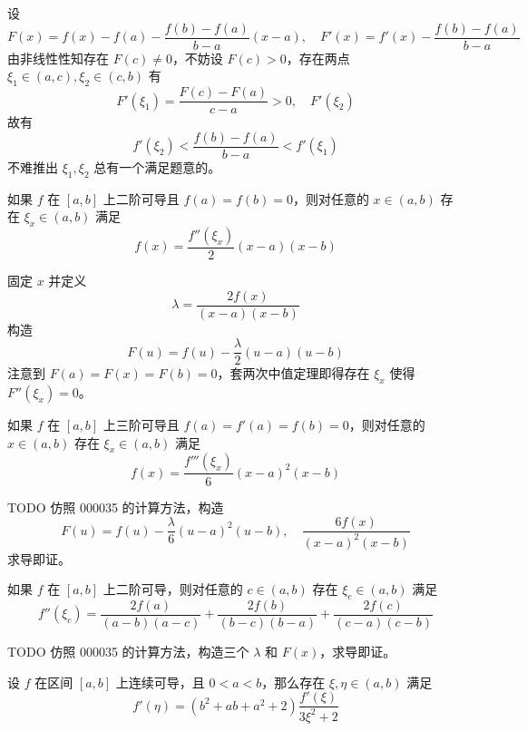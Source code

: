 \begin{solution}
	设
	\[ F(x) = f(x) - f(a) - \frac{f(b) - f(a)}{b - a}(x - a), \quad F'(x) = f'(x) - \frac{f(b) - f(a)}{b - a} \]
	由非线性性知存在 $F(c) \neq 0$，不妨设 $F(c) > 0$，存在两点 $\xi_1 \in (a, c), \xi_2 \in (c, b)$ 有
	\[ F'(\xi_1) = \frac{F(c) - F(a)}{c - a} > 0, \quad F'(\xi_2)  \]
	故有
	\[ f'(\xi_2) < \frac{f(b) - f(a)}{b - a} < f'(\xi_1) \]
	不难推出 $\xi_1, \xi_2$ 总有一个满足题意的。
\end{solution}

\begin{problem}[000035]
如果 $f$ 在 $[a, b]$ 上二阶可导且 $f(a) = f(b) = 0$，则对任意的 $x \in (a, b)$ 存在 $\xi_x \in (a, b)$ 满足
\[ f(x) = \frac{f''(\xi_x)}{2}(x - a)(x - b) \]
\end{problem}

\begin{solution}
	固定 $x$ 并定义
	\[ \lambda = \frac{2 f(x)}{(x - a)(x - b)} \]
	构造
	\[ F(u) = f(u) - \frac{\lambda}{2} (u - a)(u - b) \]
	注意到 $F(a) = F(x) = F(b) = 0$，套两次中值定理即得存在 $\xi_x$ 使得 $F''(\xi_x) = 0$。
\end{solution}

\begin{problem}[000036]
如果 $f$ 在 $[a, b]$ 上三阶可导且 $f(a) = f'(a) = f(b) = 0$，则对任意的 $x \in (a, b)$ 存在 $\xi_x \in (a, b)$ 满足
\[ f(x) = \frac{f'''(\xi_x)}{6}(x-a)^2(x-b) \]
\end{problem}

\begin{solution}
	TODO 仿照 000035 的计算方法，构造
	\[ F(u) = f(u) - \frac{\lambda}{6}(u - a)^2(u - b), \quad \frac{6f(x)}{(x - a)^2(x - b)} \]
	求导即证。
\end{solution}

\begin{problem}[000037]
如果 $f$ 在 $[a, b]$ 上二阶可导，则对任意的 $c \in (a, b)$ 存在 $\xi_c \in (a, b)$ 满足
\[ f''(\xi_c) = \frac{2 f(a)}{(a - b)(a - c)} + \frac{2 f(b)}{(b - c)(b - a)} + \frac{2f(c)}{(c- a)(c - b)} \]
\end{problem}

\begin{solution}
	TODO 仿照 000035 的计算方法，构造三个 $\lambda$ 和 $F(x)$，求导即证。
\end{solution}

\begin{problem}[000038]
设 $f$ 在区间 $[a, b]$ 上连续可导，且 $0 < a < b$，那么存在 $\xi, \eta \in (a, b)$ 满足
\[ f'(\eta) = (b^2 + ab + a^2 + 2)\frac{f'(\xi)}{3 \xi^2 + 2} \]
\end{problem}

